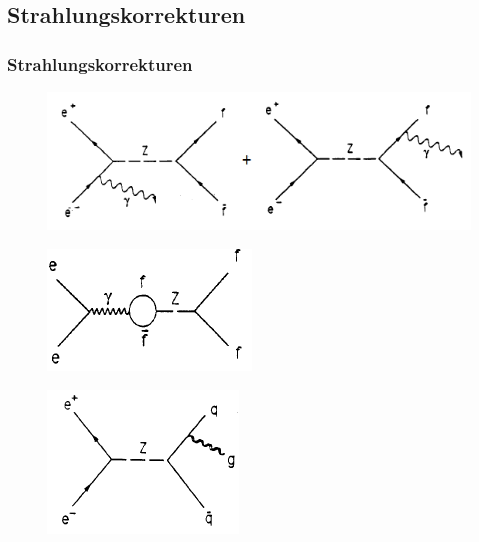 \subsection{Strahlungskorrekturen}
\begin{frame}
	\frametitle{Strahlungskorrekturen}
	\begin{figure}
		\includegraphics[width=0.75\linewidth]{graphics/Bremsstrahlungskorrektur}
	\end{figure}
	\begin{center}
	\begin{minipage}{0.4\linewidth}
			\begin{figure}
				\includegraphics[width=0.8\linewidth]{graphics/presentationvertexschleifen}
			\end{figure}
	\end{minipage}
	\begin{minipage}{0.4\linewidth}
	\begin{figure}
			\includegraphics[width=0.8\linewidth]{graphics/presentation_QCDkorrektur}
	\end{figure}
	\end{minipage}
	\end{center}
\end{frame}

